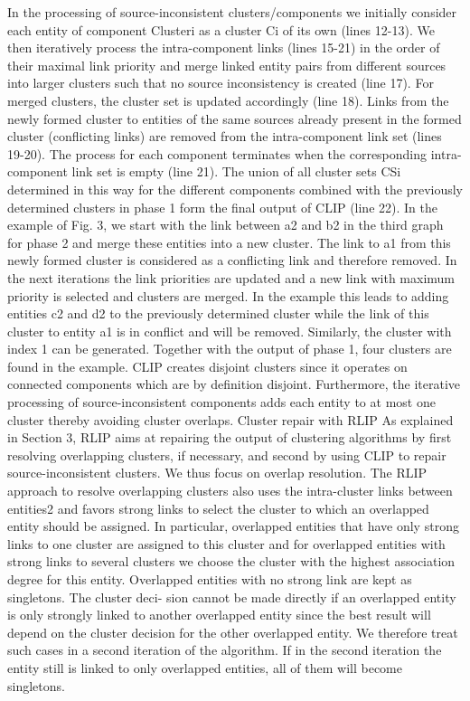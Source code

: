 \documentclass[runningheads]{llncs}
\begin{document}
In the processing of source-inconsistent clusters/components we initially consider each entity of component Clusteri as a cluster Ci of its own (lines 12-13). We then iteratively process the intra-component links (lines 15-21) in the order of their maximal link priority and merge linked entity pairs from different sources into larger clusters such that no source inconsistency is created (line 17). For merged clusters, the cluster set is updated accordingly (line 18). Links from the newly formed cluster to entities of the same sources already present in the formed cluster (conflicting links) are removed from the intra-component link set (lines 19-20). The process for each component terminates when the corresponding intra-component link set is empty (line 21). The union of all cluster sets CSi determined in this way for the different components combined with the previously determined clusters in phase 1 form the final output of CLIP (line 22). In the example of Fig. 3, we start with the link between a2 and b2 in the third graph for phase 2 and merge these entities into a new cluster. The link to a1 from this newly formed cluster is considered as a conflicting link and therefore removed. In the next iterations the link priorities are updated and a new link with maximum priority is selected and clusters are merged. In the example this leads to adding entities c2 and d2 to the previously determined cluster while the link of this cluster to entity a1 is in conflict and will be removed. Similarly, the cluster with index 1 can be generated. Together with the output of phase 1, four clusters are found in the example.
CLIP creates disjoint clusters since it operates on connected components which are by definition disjoint. Furthermore, the iterative processing of source-inconsistent components adds each entity to at most one cluster thereby avoiding cluster overlaps.
Cluster repair with RLIP
As explained in Section 3, RLIP aims at repairing the output of clustering algorithms by first resolving overlapping clusters, if necessary, and second by using CLIP to repair source-inconsistent clusters. We thus focus on overlap resolution.
The RLIP approach to resolve overlapping clusters also uses the intra-cluster links between entities2 and favors strong links to select the cluster to which an overlapped entity should be assigned. In particular, overlapped entities that have only strong links to one cluster are assigned to this cluster and for overlapped entities with strong links to several clusters we choose the cluster with the highest association degree for this entity. Overlapped entities with no strong link are kept as singletons. The cluster deci- sion cannot be made directly if an overlapped entity is only strongly linked to another overlapped entity since the best result will depend on the cluster decision for the other overlapped entity. We therefore treat such cases in a second iteration of the algorithm. If in the second iteration the entity still is linked to only overlapped entities, all of them will become singletons.
\end{document}
